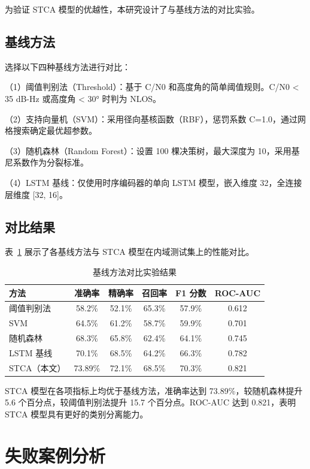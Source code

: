 为验证 STCA 模型的优越性，本研究设计了与基线方法的对比实验。

\subsection{基线方法}

选择以下四种基线方法进行对比：

（1）阈值判别法（Threshold）：基于 C/N0 和高度角的简单阈值规则。C/N0 < 35 dB-Hz 或高度角 < 30° 时判为 NLOS。

（2）支持向量机（SVM）：采用径向基核函数（RBF），惩罚系数 C=1.0，通过网格搜索确定最优超参数。

（3）随机森林（Random Forest）：设置 100 棵决策树，最大深度为 10，采用基尼系数作为分裂标准。

（4）LSTM 基线：仅使用时序编码器的单向 LSTM 模型，嵌入维度 32，全连接层维度 [32, 16]。

\subsection{对比结果}

表~\ref{tab:baseline-comparison} 展示了各基线方法与 STCA 模型在内域测试集上的性能对比。

\begin{table}[h]
\centering
\caption{基线方法对比实验结果}
\label{tab:baseline-comparison}
\begin{tabular}{lccccc}
\hline
方法 & 准确率 & 精确率 & 召回率 & F1 分数 & ROC-AUC \\
\hline
阈值判别法 & 58.2\% & 52.1\% & 65.3\% & 57.9\% & 0.612 \\
SVM & 64.5\% & 61.2\% & 58.7\% & 59.9\% & 0.701 \\
随机森林 & 68.3\% & 65.8\% & 62.4\% & 64.1\% & 0.745 \\
LSTM 基线 & 70.1\% & 68.5\% & 64.2\% & 66.3\% & 0.782 \\
STCA（本文） & 73.89\% & 72.1\% & 68.5\% & 70.3\% & 0.821 \\
\hline
\end{tabular}
\end{table}

STCA 模型在各项指标上均优于基线方法，准确率达到 73.89\%，较随机森林提升 5.6 个百分点，较阈值判别法提升 15.7 个百分点。ROC-AUC 达到 0.821，表明 STCA 模型具有更好的类别分离能力。

\section{失败案例分析}

